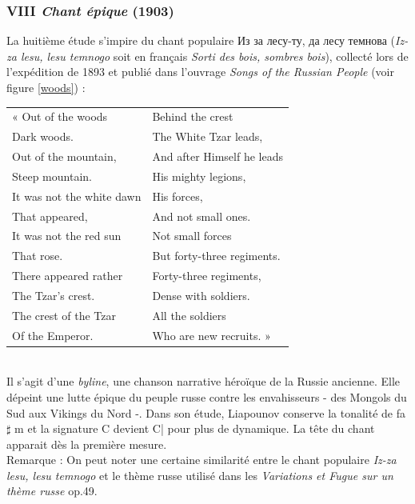 \subsubsection{VIII \emph{Chant épique} (1903)}

La huitième étude s'impire du chant populaire \foreignlanguage{russian}{Из за лесу-ту, да лесу \hbox{темнова}} (\emph{Iz-za lesu, lesu temnogo} soit en français \emph{Sorti des bois, sombres bois}), collecté lors de l'expédition de 1893 et publié dans l'ouvrage \emph{Songs of the Russian People} (voir figure \ref{woods}) :\\

\begin{tabular}{ll}
\hspace{-3.9mm}« Out of the woods
&
Behind the crest
\\
  \quad{}Dark woods.
&
  \quad{}The White Tzar leads,
\\
Out of the mountain,
&
And after Himself he leads
\\
  \quad{}Steep mountain.
&
  \quad{}His mighty legions,
\\
It was not the white dawn
&
His forces,
\\
  \quad{}That appeared,
&
  \quad{}And not small ones.
\\
It was not the red sun
&
Not small forces
\\
  \quad{}That rose.
&
  \quad{}But forty-three regiments.
\\
There appeared rather
&
Forty-three regiments,
\\
  \quad{}The Tzar’s crest.
&
  \quad{}Dense with soldiers.
\\
The crest of the Tzar
&
All the soldiers
\\
  \quad{}Of the Emperor.
&
  \quad{}Who are new recruits. »
\end{tabular}\\

Il s'agit d'une \emph{byline}, une chanson narrative héroïque de la Russie ancienne. Elle dépeint une lutte épique du peuple russe contre les envahisseurs - des Mongols du Sud aux Vikings du Nord -. Dans son étude, Liapounov conserve la tonalité de fa$\sharp$ m et la signature C devient C\hspace{-2mm}|\hspace{+2mm} pour plus de dynamique. La tête du chant apparait dès la première mesure.\\

Remarque : On peut noter une certaine similarité entre le chant populaire \emph{Iz-za lesu, lesu temnogo} et le thème russe utilisé dans les \emph{Variations et Fugue sur un thème russe} op.49.

